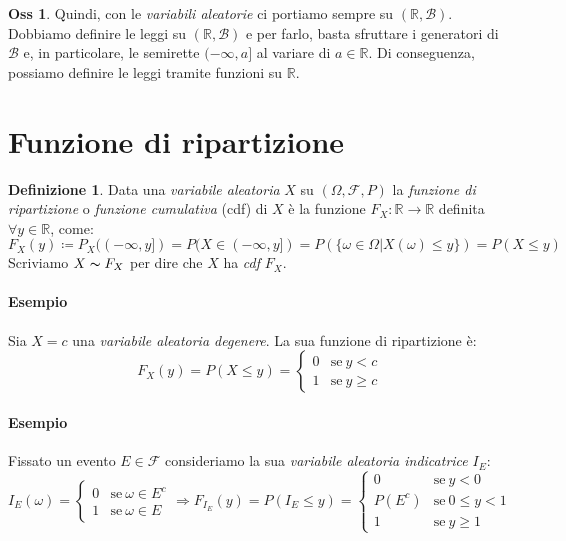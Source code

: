 \documentclass[12pt, a4paper]{report}
\theoremstyle{definition}
\newtheorem{definition}{Definizione}[section]
\newtheorem*{observation}{Oss}
\DeclareRobustCommand{\F}{\mathcal{F}}%
\DeclareRobustCommand{\R}{\mathbb{R}}%
\DeclareRobustCommand{\B}{\mathcal{B}}%
\DeclareRobustCommand{\probspace}{(\Omega,\F,P)}
\begin{document}
\begin{observation}
	Quindi, con le \emph{variabili aleatorie} ci portiamo sempre su $(\R,\B)$.
	Dobbiamo definire le leggi su $(\R,\B)$ e per farlo, basta sfruttare i
	generatori di $\B$ e, in particolare, le semirette $(-\infty,a]$ al
	variare di \(a\in\R\). Di conseguenza, possiamo definire le leggi tramite
	funzioni su $\R$.
\end{observation}

\newpage
\section{Funzione di ripartizione}
\begin{definition}
	Data una \emph{variabile aleatoria} $X$ su $\probspace$ la \emph{funzione di
	ripartizione} o \emph{funzione cumulativa} (cdf) di $X$ è la funzione \(F_X:
	\R\rightarrow\R\) definita \(\forall y\in\R\), come:
	\[F_X(y)\coloneqq P_X((-\infty, y])=P(X\in(-\infty, y])=P(\{\omega\in\Omega|
	X(\omega)\leq y\})=P(X\leq y)\]
	Scriviamo \(X\thicksim F_X\) per dire che $X$ ha \emph{cdf} $F_X$.
\end{definition}

\paragraph*{Esempio}
Sia \(X=c\) una \emph{variabile aleatoria degenere}. La sua funzione di
ripartizione è:
\[F_X(y)=P(X\leq y)=\begin{cases}
	{0} & \text{se}\ {y < c}\\
	{1} & \text{se}\ {y\geq c}
\end{cases}\]

\begin{center}
\end{center}

\paragraph*{Esempio}
Fissato un evento \(E\in\F\) consideriamo la sua \emph{variabile aleatoria
indicatrice} $I_E$:
\[I_E(\omega)=\begin{cases}
	{0} & \text{se}\ {\omega\in E^c}\\
	{1} & \text{se}\ {\omega\in E}
\end{cases}\Rightarrow F_{I_E}(y)=P(I_E\leq y)=\begin{cases}
	{0} & \text{se}\ {y<0}\\
	{P(E^c)} & \text{se}\ {0\leq y<1}\\
	{1} & \text{se}\ {y\geq 1}
\end{cases}\]
\end{document}
